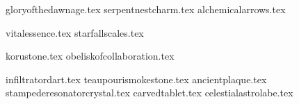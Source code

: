
\raggedcolumns
\begin{multicols}{2}
\subtitle{\weaponenchantments}
\startsortedpricelist
{gloryofthedawnage.tex}
{serpentnestcharm.tex}
{alchemicalarrows.tex}
\endsortedpricelist

\subtitle{\armourenchantments}
\startsortedpricelist
{vitalessence.tex}
{starfallscales.tex}
\endsortedpricelist

\subtitle{\bannerenchantments}
\startsortedpricelist
{korustone.tex}
{obeliskofcollaboration.tex}
\endsortedpricelist

\subtitle{\artefacts}
\startsortedpricelist
{infiltratordart.tex}
{teaupourismokestone.tex}
{ancientplaque.tex}
{stampederesonatorcrystal.tex}
{carvedtablet.tex}
{celestialastrolabe.tex}
\endsortedpricelist
\end{multicols}{}

